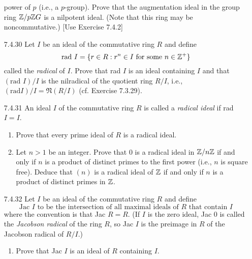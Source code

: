 \begin{enumerate}
                  power of $p$ (i.e., a $p$-group). Prove that the augmentation
                  ideal in the group ring $\mathbb{Z}/p\mathbb{Z} G$ is a nilpotent ideal. (Note
                  that this ring may be noncommutative.) [Use Exercise 7.4.2]
   \item[7.4.30]  Let $I$ be an ideal of the commutative ring $R$ and define
                  $$\text{rad }I = \{r \in R : r^n \in I
                    \text{ for some }n \in \mathbb{Z}^+\}$$
                  called the \textit{radical} of $I$. Prove that rad $I$ is an
                  ideal containing $I$ and that $(\text{rad }I)/I$ is the
                  nilradical of the quotient ring $R/I$, i.e.,
                  $(\text{rad} I)/I = \mathfrak{N}(R/I)$ (cf. Exercise 7.3.29).
   \item[7.4.31]  An ideal $I$ of the commutative ring $R$ is called a
                  \textit{radical ideal} if rad $I = I$.
                  \begin{enumerate}
                     \item Prove that every prime ideal of $R$ is a radical
                           ideal.
                     \item Let $n > 1$ be an integer. Prove that 0 is a radical
                           ideal in $\mathbb{Z}/n\mathbb{Z}$ if and only if $n$ is a product of
                           distinct primes to the first power (i.e., $n$ is
                           square free). Deduce that $(n)$ is a radical ideal of
                           $\mathbb{Z}$ if and only if $n$ is a product of distinct
                           primes in $\mathbb{Z}$.
                  \end{enumerate}
   \item[7.4.32]  Let $I$ be an ideal of the commutative ring $R$ and define
                  $$\text{Jac $I$ to be the intersection of all maximal ideals
                     of $R$ that contain $I$}$$
                  where the convention is that Jac $R = R$. (If $I$ is the zero
                  ideal, Jac 0 is called the \textit{Jacobson radical} of the
                  ring $R$, so Jac $I$ is the preimage in $R$ of the Jacobson
                  radical of $R/I$.)
                  \begin{enumerate}
                     \item Prove that Jac $I$ is an ideal of $R$ containing $I$.

\end{enumerate}
\end{enumerate}
